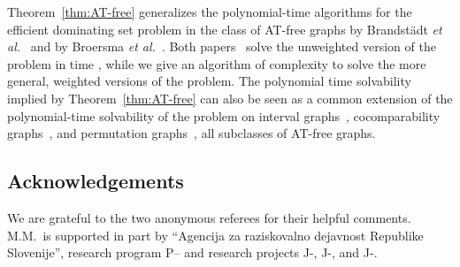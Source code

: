\documentclass[]{elsarticle}
\def\minwed{{\sc{Min-WED }}}
\begin{document}
Theorem~\ref{thm:AT-free} generalizes the polynomial-time algorithms for the efficient dominating set problem in the class of AT-free graphs by Brandst\"adt \emph{et al.}~\cite{BLR} and by Broersma \emph{et al.}~\cite{BKM99}.
Both papers~\cite{BLR,BKM99} solve the unweighted version of the problem in time , while we give an algorithm of complexity  to solve the more general, weighted versions of the problem.
The polynomial time solvability implied by Theorem~\ref{thm:AT-free} can also be seen as a common extension of the polynomial-time solvability of the \minwed problem on interval graphs~\cite{CL94}, cocomparability graphs~\cite{CRC95}, and permutation graphs~\cite{LLT97}, all subclasses of AT-free graphs.


\subsection*{Acknowledgements}

We are grateful to the two anonymous referees for their helpful comments. 
M.M.~is supported in part by ``Agencija za raziskovalno dejavnost Republike Slovenije'', research program P-- and research projects J-, J-, and J-.
\end{document}
